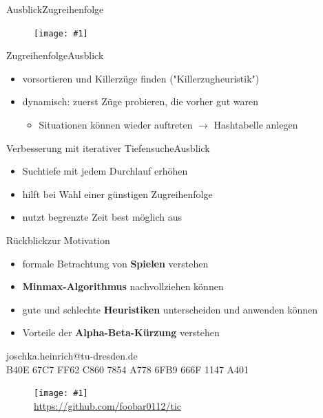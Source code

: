 \documentclass[18pt, aspectratio=169, handout]{beamer}
\newcommand\g[3]{%
  \begin{figure}[!ht]
  \centering
  \texttt{[image: \#1]}
  {\small#3}
  \end{figure}}
\begin{document}

\begin{frame}{Ausblick}{Zugreihenfolge}
  \g{a/agenda_diagram_Ausblick.pdf}{0.5}{}
\end{frame}

\begin{frame}{Zugreihenfolge}{Ausblick}
  \begin{itemize}
  \item
    vorsortieren und Killerzüge finden ("Killerzugheuristik")
  \item
    dynamisch: zuerst Züge probieren, die vorher gut waren
    \begin{itemize}
    \item
      Situationen können wieder auftreten $\rightarrow$ Hashtabelle anlegen
    \end{itemize}
  \end{itemize}
\end{frame}


\begin{frame}{Verbesserung mit iterativer Tiefensuche}{Ausblick}
  \begin{itemize}
  	\item Suchtiefe mit jedem Durchlauf erhöhen
  	\pause
  \item
    hilft bei Wahl einer günstigen Zugreihenfolge
  \item
    nutzt begrenzte Zeit best möglich aus
  \end{itemize}
\end{frame}

\begin{frame}{Rückblick}{zur Motivation}
  \begin{itemize}
		\item
		  formale Betrachtung von \textbf{Spielen} verstehen
		\item
		  \textbf{Minmax-Algorithmus} nachvollziehen können
  	\item
		  gute und schlechte \textbf{Heuristiken} unterscheiden und anwenden können
		\item
		  Vorteile der \textbf{Alpha-Beta-Kürzung} verstehen
	\end{itemize}
\end{frame}



\begin{frame}{}{}
  \begin{center}
  joschka.heinrich@tu-dresden.de\\

  \vspace{\baselineskip}
  B40E 67C7 FF62 C860 7854 A778 6FB9 666F 1147 A401\\
  \vspace{\baselineskip}

  \g{img/github.png}{0.2}{\\\url{https://github.com/foobar0112/tic}}
  \end{center}
\end{frame}
\end{document}
